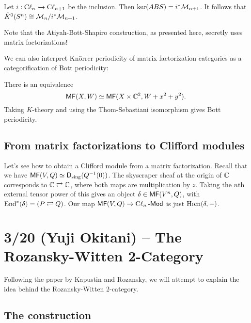 \documentclass{article}
\begin{document}
\begin{thm}
	Let $i: \operatorname{C\ell}_n \hookrightarrow \operatorname{C\ell}_{n+1}$ be the inclusion.
	Then $\ker(\mathop{ABS}) = i^* \mathcal{M}_{n+1}$.
	It follows that $\tilde{K}^0(S^n) \cong \mathcal{M}_n / i^* \mathcal{M}_{n+1}$.
\end{thm}

Note that the Atiyah-Bott-Shapiro construction, as presented here, secretly uses matrix factorizations!

We can also interpret Kn\"orrer periodicity of matrix factorization categories as a categorification of Bott periodicity:

\begin{thm}
	There is an equivalence
	\[
		\mathsf{MF}(X, W) \simeq \mathsf{MF}(X \times \mathbb{C}^2, W + x^2 + y^2).
	\]
	Taking $K$-theory and using the Thom-Sebastiani isomorphism gives Bott periodicity.
\end{thm}

\subsection{From matrix factorizations to Clifford modules}

Let's see how to obtain a Clifford module from a matrix factorization.
Recall that we have $\mathsf{MF}(V, Q) \simeq \mathsf{D}_{\mathrm{sing}}(Q^{-1}(0))$.
The skyscraper sheaf at the origin of $\mathbb{C}$ corresponds to $\mathbb{C} \rightleftarrows \mathbb{C}$, where both maps are multiplication by $z$.
Taking the $n$th external tensor power of this gives an object $\delta \in \mathsf{MF}(V^n, Q)$, with $\operatorname{End}^*(\delta) = (P \rightleftarrows Q)$.
Our map $\mathsf{MF}(V, Q) \to \operatorname{C\ell}_n\text{-}\mathsf{Mod}$ is just $\operatorname{Hom}(\delta, -)$.

\section{3/20 (Yuji Okitani) -- The Rozansky-Witten 2-Category}

Following the paper by Kapustin and Rozansky, we will attempt to explain the idea behind the Rozansky-Witten 2-category.

\subsection{The construction}
\end{document}
